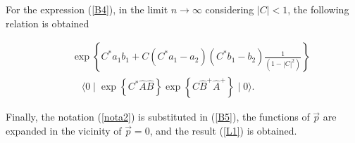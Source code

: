 \documentclass[12pt,letterpaper]{report}
\begin{document}
For the expression (\ref{B4}), in the limit $n\rightarrow \infty $
considering $\left| C\right| <1$, the following relation is
obtained

\begin{eqnarray}
&&\exp \left\{ C^{*}a_1b_1+C\left(C^{*}a_1-a_2\right) \left(
C^{*}b_1-b_2\right) \frac 1{\left(1-\left| C\right| ^2\right)
}\right\} \nonumber \\ &&\quad \langle 0\mid \exp \left\{
C^{*}\hat{A}\hat{B}\right\} \exp \left\{ C
\hat{B}^{+}\hat{A}^{+}\right\} \mid 0\rangle. \label{B5}
\end{eqnarray}

Finally, the notation (\ref{nota2}) is substituted in (\ref{B5}),
the functions of $\vec{p}$ are expanded in the vicinity of
$\vec{p}=0$, and the result (\ref{L1}) is obtained.
\end{document}
